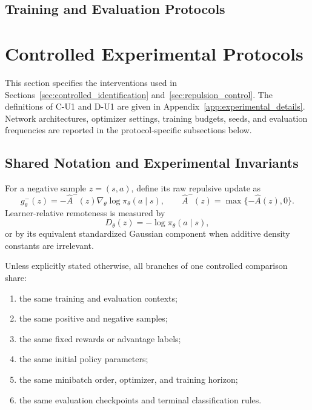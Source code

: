 \subsection{Training and Evaluation Protocols}

\section{Controlled Experimental Protocols}
\label{app:controlled_protocols}

This section specifies the interventions used in
Sections~\ref{sec:controlled_identification}
and~\ref{sec:repulsion_control}. The definitions of C-U1 and D-U1 are given in
Appendix~\ref{app:experimental_details}. Network architectures,
optimizer settings, training budgets, seeds, and evaluation frequencies
are reported in the protocol-specific subsections below.

\subsection{Shared Notation and Experimental Invariants}
\label{app:controlled_shared}

For a negative sample
$z=(s,a)$, define its raw repulsive update as
\begin{equation}
    g_\theta^-(z)
    =
    -\widehat A^-(z)
    \nabla_\theta
    \log\pi_\theta(a\mid s),
    \qquad
    \widehat A^-(z)
    =
    \max\{-\widehat A(z),0\}.
    \label{eq:controlled_negative_update}
\end{equation}
Learner-relative remoteness is measured by
\begin{equation}
    D_\theta(z)
    =
    -\log\pi_\theta(a\mid s),
    \label{eq:controlled_remoteness}
\end{equation}
or by its equivalent standardized Gaussian component when additive
density constants are irrelevant.

Unless explicitly stated otherwise, all branches of one controlled
comparison share:

\begin{enumerate}
    \item the same training and evaluation contexts;
    \item the same positive and negative samples;
    \item the same fixed rewards or advantage labels;
    \item the same initial policy parameters;
    \item the same minibatch order, optimizer, and training horizon;
    \item the same evaluation checkpoints and terminal classification
    rules.
\end{enumerate}


